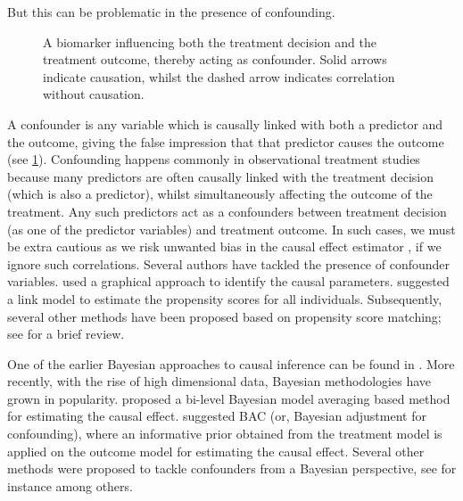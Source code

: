 \documentclass[preprint,12pt]{elsarticle}
\begin{document}
But this
can be problematic in the presence of confounding.
\begin{figure}
\begin{center}
\end{center}
\caption{A biomarker influencing both the treatment decision and the treatment outcome, thereby acting as confounder. Solid arrows indicate causation, whilst the dashed arrow indicates correlation without causation.}
\label{fig:confounding}
\end{figure}
A confounder is any variable which is causally linked with both a predictor and the outcome, giving the false impression that that predictor causes the outcome (see \cref{fig:confounding}).
Confounding happens commonly in observational treatment studies because many predictors are often causally linked with the treatment decision (which is also a predictor), whilst simultaneously affecting the outcome of the treatment. Any such predictors act as a confounders between treatment decision (as one of the predictor variables) and treatment outcome.
In such cases, we must be extra cautious as we risk
unwanted bias in the causal effect estimator \citep{rosenbaum83},
if we ignore such correlations.
Several authors have tackled the presence of
confounder variables. 
 used a graphical
approach to identify the causal parameters.
 suggested a link model to estimate
the propensity scores for all individuals. Subsequently, several other
methods have been proposed based on propensity score matching;
see \citep{winship99,stuart10} for a brief review.

One of the earlier Bayesian approaches to causal inference
can be found in \citep{rubin1978}. More recently,
with the rise of high dimensional data,
Bayesian methodologies have grown in popularity.
 proposed a bi-level 
Bayesian model averaging based method for estimating the causal 
effect.  suggested BAC (or, Bayesian adjustment for
confounding),
where an informative prior obtained from
the treatment model is applied on the outcome model for
estimating the causal effect. Several other methods were
proposed to tackle confounders from a Bayesian perspective,
see for instance \citep{Zigler2014,Hahn2018} among others.
\end{document}
